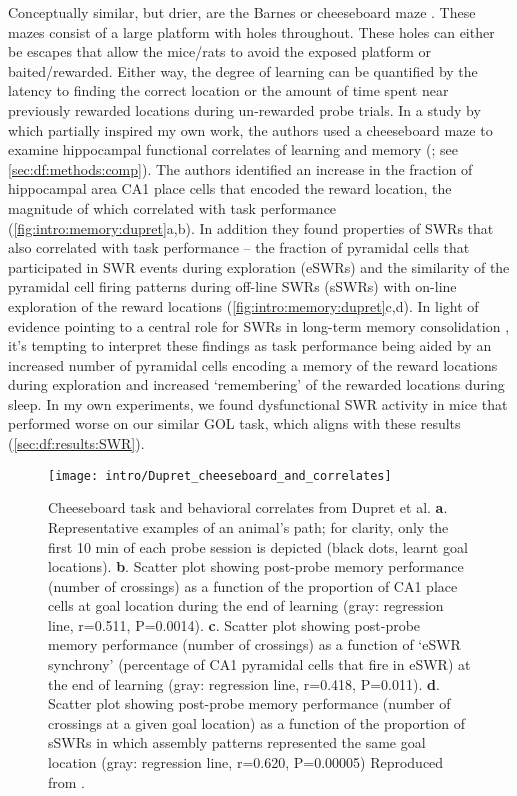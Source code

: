 Conceptually similar, but drier, are the Barnes or cheeseboard maze \citep{Barnes1979, Kesner1991, Dupret2010a}.
These mazes consist of a large platform with holes throughout.
These holes can either be escapes that allow the mice/rats to avoid the exposed platform or baited/rewarded.
Either way, the degree of learning can be quantified by the latency to finding the correct location or the amount of time spent near previously rewarded locations during un-rewarded probe trials.
In a study by \citeauthor{Dupret2010a} which partially inspired my own work, the authors used a cheeseboard maze to examine hippocampal functional correlates of learning and memory (\citealp{Dupret2010a}; see \autoref{sec:df:methods:comp}).
The authors identified an increase in the fraction of hippocampal area CA1 place cells that encoded the reward location, the magnitude of which correlated with task performance (\autoref{fig:intro:memory:dupret}a,b).
In addition they found properties of \acp{SWR} that also correlated with task performance -- the fraction of pyramidal cells that participated in \ac{SWR} events during exploration (eSWRs) and the similarity of the pyramidal cell firing patterns during off-line \acp{SWR} (sSWRs) with on-line exploration of the reward locations (\autoref{fig:intro:memory:dupret}c,d).
In light of evidence pointing to a central role for SWRs in long-term memory consolidation \citep{Buzsaki2015}, it's tempting to interpret these findings as task performance being aided by an increased number of pyramidal cells encoding a memory of the reward locations during exploration and increased `remembering' of the rewarded locations during sleep.
In my own experiments, we found dysfunctional \ac{SWR} activity in mice that performed worse on our similar \ac{GOL} task, which aligns with these results (\autoref{sec:df:results:SWR}).

\begin{figure}
	\centering
	\texttt{[image: intro/Dupret\_cheeseboard\_and\_correlates]}
	\caption[Cheeseboard task and behavioral correlates from Dupret et al.]{Cheeseboard task and behavioral correlates from Dupret et al.
	\textbf{a}. Representative examples of an animal's path; for clarity, only the first 10 min of each probe session is depicted (black dots, learnt goal locations).
	\textbf{b}. Scatter plot showing post-probe memory performance (number of crossings) as a function of the proportion of CA1 place cells at goal location during the end of learning (gray: regression line, r=0.511, P=0.0014).
	\textbf{c}. Scatter plot showing post-probe memory performance (number of crossings) as a function of `eSWR synchrony' (percentage of CA1 pyramidal cells that fire in eSWR) at the end of learning (gray: regression line, r=0.418, P=0.011).
	\textbf{d}. Scatter plot showing post-probe memory performance (number of crossings at a given goal location) as a function of the proportion of sSWRs in which assembly patterns represented the same goal location (gray: regression line, r=0.620, P=0.00005)
	Reproduced from \citet{Dupret2010a}.}
	\label{fig:intro:memory:dupret}
\end{figure}

